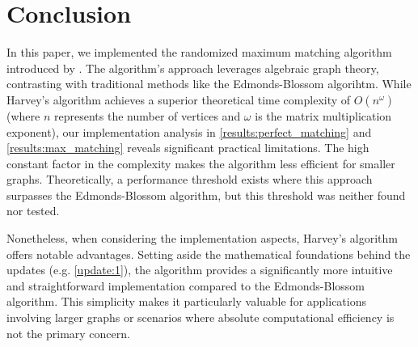 \chapter{Conclusion}

In this paper, we implemented the randomized maximum matching algorithm introduced by \citet{Harvey:Paper}. 
The algorithm's approach leverages algebraic graph theory, contrasting with traditional methods like the Edmonds-Blossom\cite{Edmonds} algorihtm. 
While Harvey's algorithm achieves a superior theoretical time complexity of $O(n^\omega)$ (where $n$ represents the number of vertices and $\omega$ is the matrix multiplication exponent), our implementation analysis in \cref{results:perfect_matching} and \cref{results:max_matching} reveals significant practical limitations. 
The high constant factor in the complexity makes the algorithm less efficient for smaller graphs.
Theoretically, a performance threshold exists where this approach surpasses the Edmonds-Blossom algorithm, but this threshold was neither found nor tested.

Nonetheless, when considering the implementation aspects, Harvey's algorithm offers notable advantages. 
Setting aside the mathematical foundations behind the updates (e.g. \cref{update:1}), the algorithm provides a significantly more intuitive and straightforward implementation compared to the Edmonds-Blossom algorithm. 
This simplicity makes it particularly valuable for applications involving larger graphs or scenarios where absolute computational efficiency is not the primary concern.
